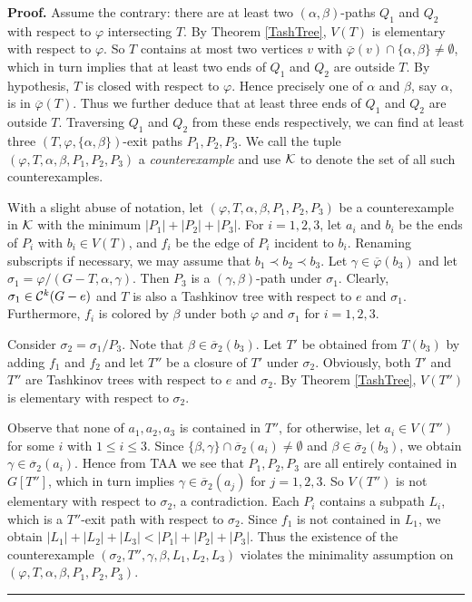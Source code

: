 \documentclass[11pt]{article}
\newcommand{\phibar}{\overline{\varphi}}
\def\qed{\hfill \rule{4pt}{7pt}}
\begin{document}
{\bf Proof.} Assume the contrary: there are at least two $(\alpha,\beta)$-paths $Q_1$ and $Q_2$ with respect 
to $\varphi$ intersecting $T$. By Theorem \ref{TashTree}, $V(T)$ is elementary with respect to $\varphi$. So  
$T$ contains at most two vertices $v$ with $\overline{\varphi}(v) \cap \{\alpha, \beta\} \ne \emptyset$, 
which in turn implies that at least two ends of $Q_1$ and $Q_2$ are outside $T$. By hypothesis, $T$ is closed 
with respect to $\varphi$. Hence precisely one of $\alpha$ and $\beta$, say $\alpha$, is in $\overline{\varphi}(T)$. 
Thus we further deduce that at least three ends of $Q_1$ and $Q_2$ are outside $T$. Traversing $Q_1$ and $Q_2$ 
from these ends respectively, we can find at least three $(T, \varphi, \{\alpha, \beta\})$-exit paths 
$P_1,P_2,P_3$. We call the tuple $(\varphi,T, \alpha, \beta, P_1,P_2,P_3)$ a {\em counterexample} and use ${\cal K}$ 
to denote the set of all such counterexamples.

With a slight abuse of notation, let $(\varphi, T, \alpha, \beta, P_1,P_2,P_3)$ be a counterexample in ${\cal K}$ with 
the minimum $|P_1|+|P_2|+|P_3|$. For $i=1,2,3$, let $a_i$ and $b_i$ be the ends of $P_i$ with $b_i \in V(T)$, 
and $f_i$ be the edge of $P_i$ incident to $b_i$.  Renaming subscripts if necessary, we may assume that $b_1\prec b_2 
\prec b_3$.  Let $\gamma\in\phibar(b_3)$ and let $\sigma_1=\varphi/(G-T,\alpha,\gamma)$. Then $P_3$ is a $(\gamma,\beta)$-path under $\sigma_1$. Clearly, $\sigma_1 \in 
{\cal C}^k(G-e)$ and $T$ is also a Tashkinov tree with respect to $e$ and $\sigma_1$. Furthermore, $f_i$ is colored 
by $\beta$ under both $\varphi$ and $\sigma_1$ for $i=1,2,3$.  

Consider $\sigma_2=\sigma_1/P_3$. Note that $\beta \in \overline{\sigma}_2(b_3)$.
Let $T'$ be obtained from $T(b_3)$ by adding $f_1$ and $f_2$ and let $T''$ be a closure of $T'$ under $\sigma_2$.
Obviously, both $T'$ and $T''$ are Tashkinov trees with respect to $e$ and $\sigma_2$. By Theorem \ref{TashTree}, 
$V(T'')$ is elementary with respect to $\sigma_2$. 

Observe that none of $a_1,a_2,a_3$ is contained in $T''$, for otherwise, let $a_i \in V(T'')$ for some $i$
with $1\le i \le 3$. Since $\{\beta,\gamma\}\cap \overline{\sigma}_2(a_i) \ne \emptyset$ and $\beta \in \overline{\sigma}_2(b_3)$, 
we obtain $\gamma \in \overline{\sigma}_2(a_i)$. Hence from TAA we see that $P_1,P_2,P_3$ are all entirely contained in $G[T'']$, 
which in turn implies  $\gamma \in \overline{\sigma}_2(a_j)$ for $j=1,2,3$. So $V(T'')$ is not 
elementary with respect to $\sigma_2$, a contradiction. Each $P_i$ contains a subpath $L_i$, which is a $T''$-exit path 
with respect to $\sigma_2$. Since $f_1$ is not contained in $L_1$, we obtain $|L_1|+|L_2|+|L_3|<|P_1|+|P_2|+|P_3|$.
Thus the existence of the counterexample $(\sigma_2, T'', \gamma, \beta, L_1,L_2,L_3)$ violates the minimality 
assumption on $(\varphi, T, \alpha, \beta, P_1,P_2,P_3)$. \qed
 
\end{document}
